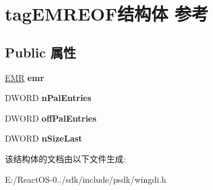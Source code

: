 \hypertarget{structtag_e_m_r_e_o_f}{}\section{tag\+E\+M\+R\+E\+O\+F结构体 参考}
\label{structtag_e_m_r_e_o_f}
\subsection*{Public 属性}
\begin{DoxyCompactItemize}
\item 
\mbox{\label{structtag_e_m_r_e_o_f_a538adc28520642ba4ae618013d30664d}} 
\hyperlink{structtag_e_m_r}{E\+MR} {\bfseries emr}
\item 
\mbox{\label{structtag_e_m_r_e_o_f_adc235903bf59f2a9f678ae05ceaa9224}} 
D\+W\+O\+RD {\bfseries n\+Pal\+Entries}
\item 
\mbox{\label{structtag_e_m_r_e_o_f_accecf00c6ed5a48a4963f15c9625da74}} 
D\+W\+O\+RD {\bfseries off\+Pal\+Entries}
\item 
\mbox{\label{structtag_e_m_r_e_o_f_a735208921ca6bd4f1929d665a9ff0bee}} 
D\+W\+O\+RD {\bfseries n\+Size\+Last}
\end{DoxyCompactItemize}


该结构体的文档由以下文件生成\+:\begin{DoxyCompactItemize}
\item 
E\+:/\+React\+O\+S-\/0../sdk/include/psdk/wingdi.\+h\end{DoxyCompactItemize}
